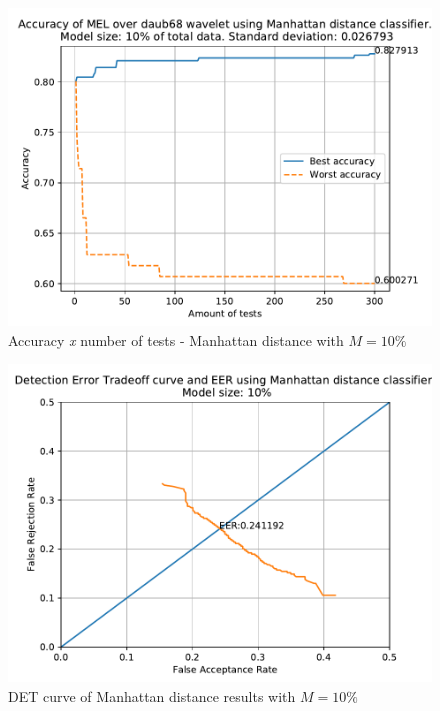 	
		\begin{figure}[H]
			\centering
			\includegraphics[scale=.8]{images/results/confusionMatrices/classifier_Manhattan_10.pdf}
			\caption{Accuracy \textit{x} number of tests - Manhattan distance with $M=10\%$}
			\label{fig:classifiermanhattan10}
		\end{figure}
		\begin{figure}[H]
			\centering
			\includegraphics[scale=.8]{images/results/det/DET_for_classifier_Manhattan_10.pdf}
			\caption{DET curve of Manhattan distance results with $M=10\%$}
			\label{fig:detforclassifiermanhattan10}
		\end{figure}
	

